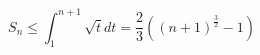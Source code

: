 \begin{displaymath}
 S_n\leq \int_{1}^{n+1}\sqrt{t}dt =\frac{2}{3}\left((n+1)^{\frac{3}{2}}-1 \right) 
\end{displaymath}
